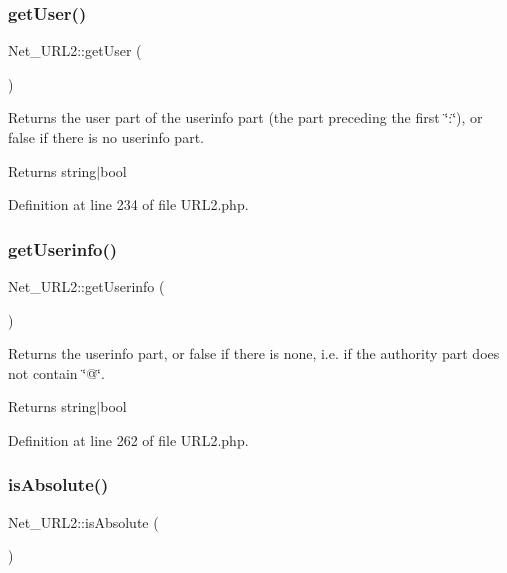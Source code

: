 \subsubsection{\texorpdfstring{get\+User()}{getUser()}}
{\footnotesize\ttfamily Net\+\_\+\+U\+R\+L2\+::get\+User (\begin{DoxyParamCaption}{ }\end{DoxyParamCaption})}

Returns the user part of the userinfo part (the part preceding the first \char`\"{}\+:\char`\"{}), or false if there is no userinfo part.

\begin{DoxyReturn}{Returns}
string$\vert$bool 
\end{DoxyReturn}


Definition at line 234 of file U\+R\+L2.\+php.

\hypertarget{classNet__URL2_a9249aba1b6b07ac8f992033cc865a455}{}\label{classNet__URL2_a9249aba1b6b07ac8f992033cc865a455} 
\subsubsection{\texorpdfstring{get\+Userinfo()}{getUserinfo()}}
{\footnotesize\ttfamily Net\+\_\+\+U\+R\+L2\+::get\+Userinfo (\begin{DoxyParamCaption}{ }\end{DoxyParamCaption})}

Returns the userinfo part, or false if there is none, i.\+e. if the authority part does not contain \char`\"{}@\char`\"{}.

\begin{DoxyReturn}{Returns}
string$\vert$bool 
\end{DoxyReturn}


Definition at line 262 of file U\+R\+L2.\+php.

\hypertarget{classNet__URL2_adfb0cbaed0f947990271d8df410854e2}{}\label{classNet__URL2_adfb0cbaed0f947990271d8df410854e2} 
\subsubsection{\texorpdfstring{is\+Absolute()}{isAbsolute()}}
{\footnotesize\ttfamily Net\+\_\+\+U\+R\+L2\+::is\+Absolute (\begin{DoxyParamCaption}{ }\end{DoxyParamCaption})}

